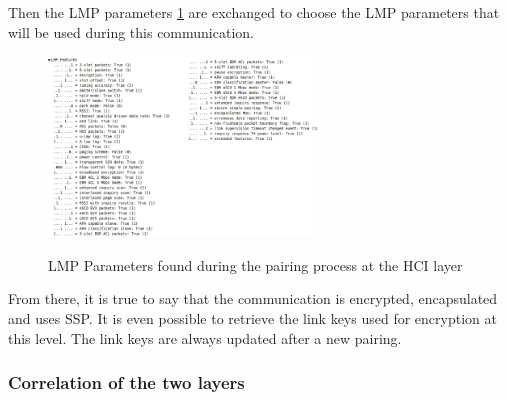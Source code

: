 Then the LMP parameters \ref{fig:lmp} are exchanged to choose the LMP parameters that will be used during this communication. 
\begin{figure}[!h]
  \begin{center}
	\includegraphics[width=270px]{images/LMP_PARAM.jpg}
	\label{fig:lmp}
	\caption{LMP Parameters found during the pairing process at the HCI layer}
  \end{center}
\end{figure}

From there, it is true to say that the communication is encrypted, encapsulated and uses SSP. It is even possible to retrieve the link keys used for encryption at this level. The link keys are always updated after a new pairing.

\subsubsection{Correlation of the two layers}

